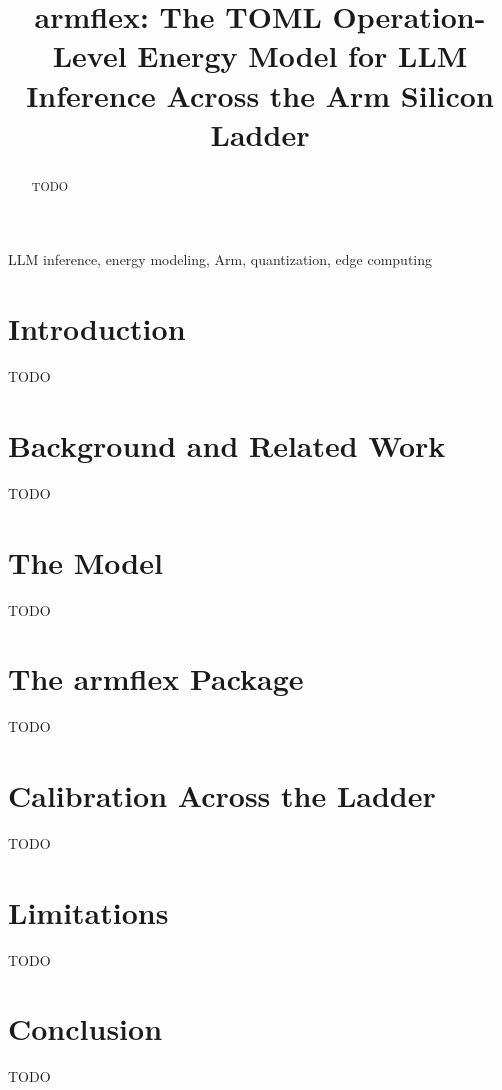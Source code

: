 \documentclass[conference]{IEEEtran}
\begin{document}
\title{armflex: The TOML Operation-Level Energy Model for LLM Inference
Across the Arm Silicon Ladder}

\author{
}

\maketitle

\begin{abstract}
TODO
\end{abstract}

\begin{IEEEkeywords}
LLM inference, energy modeling, Arm, quantization, edge computing
\end{IEEEkeywords}

\section{Introduction}
TODO

\section{Background and Related Work}
TODO

\section{The Model}
TODO

\section{The armflex Package}
TODO

\section{Calibration Across the Ladder}
TODO

\section{Limitations}
TODO

\section{Conclusion}
TODO



\end{document}
